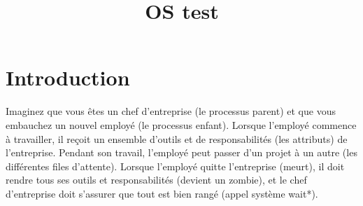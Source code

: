 \documentclass[12pt]{report}
\title{OS test}
\author{}
\begin{document}
\maketitle
\tableofcontents
\newpage

\section{Introduction}
\begin{tcolorbox}[     colback=blue!10,     colframe=blue,     title={\fontfamily{lmr}\selectfont \faComment\ Vulgarisation simple},     fonttitle=\bfseries,     fontupper=\fontfamily{lmr}\selectfont,     boxrule=1pt,     sharp corners,        ]Imaginez que vous êtes un chef d'entreprise (le processus parent) et que vous embauchez un nouvel employé (le processus enfant). Lorsque l'employé commence à travailler, il reçoit un ensemble d'outils et de responsabilités (les attributs) de l'entreprise. Pendant son travail, l'employé peut passer d'un projet à un autre (les différentes files d'attente). Lorsque l'employé quitte l'entreprise (meurt), il doit rendre tous ses outils et responsabilités (devient un zombie), et le chef d'entreprise doit s'assurer que tout est bien rangé (appel système wait*).\end{tcolorbox}  
\end{document}
